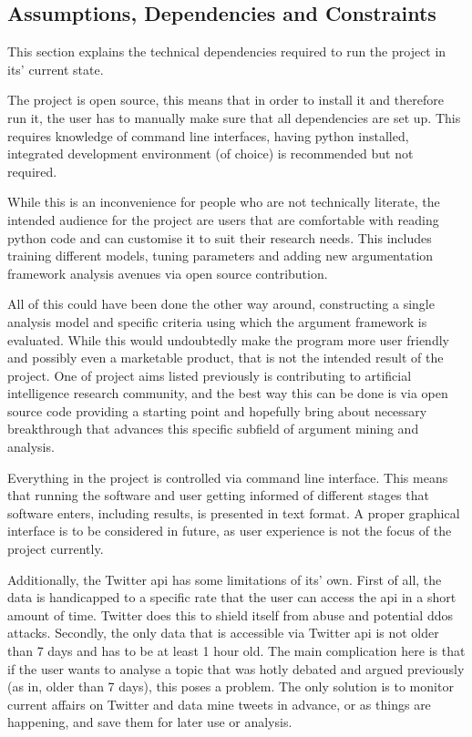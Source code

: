     \subsection{Assumptions, Dependencies and Constraints} \label{assumptionsdependencies}
        This section explains the technical dependencies required to run the project in its' current state.
        
        The project is open source, this means that in order to install it and therefore run it, the user has to manually make sure that all dependencies are set up. This requires knowledge of command line interfaces, having python installed, integrated development environment (of choice) is recommended but not required.
        
        While this is an inconvenience for people who are not technically literate, the intended audience for the project are users that are comfortable with reading python code and can customise it to suit their research needs. This includes training different models, tuning parameters and adding new argumentation framework analysis avenues via open source contribution.
        
        All of this could have been done the other way around, constructing a single analysis model and specific criteria using which the argument framework is evaluated. While this would undoubtedly make the program more user friendly and possibly even a marketable product, that is not the intended result of the project. One of project aims listed previously is contributing to artificial intelligence research community, and the best way this can be done is via open source code providing a starting point and hopefully bring about necessary breakthrough that advances this specific subfield of argument mining and analysis.

        Everything in the project is controlled via command line interface. This means that running the software and user getting informed of different stages that software enters, including results, is presented in text format. A proper graphical interface is to be considered in future, as user experience is not the focus of the project currently.
        
        Additionally, the Twitter \gls{api} has some limitations of its' own. First of all, the data is handicapped to a specific rate that the user can access the \gls{api} in a short amount of time. Twitter does this to shield itself from abuse and potential \gls{ddos} attacks. Secondly, the only data that is accessible via Twitter \gls{api} is not older than 7 days and has to be at least 1 hour old. The main complication here is that if the user wants to analyse a topic that was hotly debated and argued previously (as in, older than 7 days), this poses a problem. The only solution is to monitor current affairs on Twitter and data mine tweets in advance, or as things are happening, and save them for later use or analysis.